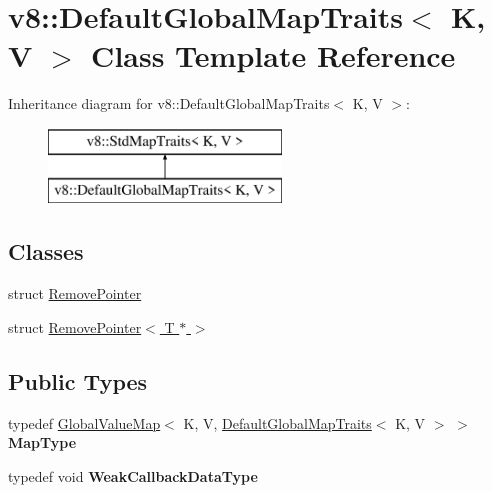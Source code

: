 \hypertarget{classv8_1_1_default_global_map_traits}{}\section{v8\+:\+:Default\+Global\+Map\+Traits$<$ K, V $>$ Class Template Reference}
\label{classv8_1_1_default_global_map_traits}
Inheritance diagram for v8\+:\+:Default\+Global\+Map\+Traits$<$ K, V $>$\+:\begin{figure}[H]
\begin{center}
\leavevmode
\includegraphics[height=2.000000cm]{classv8_1_1_default_global_map_traits}
\end{center}
\end{figure}
\subsection*{Classes}
\begin{DoxyCompactItemize}
\item 
struct \hyperlink{structv8_1_1_default_global_map_traits_1_1_remove_pointer}{Remove\+Pointer}
\item 
struct \hyperlink{structv8_1_1_default_global_map_traits_1_1_remove_pointer_3_01_t_01_5_01_4}{Remove\+Pointer$<$ T $\ast$ $>$}
\end{DoxyCompactItemize}
\subsection*{Public Types}
\begin{DoxyCompactItemize}
\item 
typedef \hyperlink{classv8_1_1_global_value_map}{Global\+Value\+Map}$<$ K, V, \hyperlink{classv8_1_1_default_global_map_traits}{Default\+Global\+Map\+Traits}$<$ K, V $>$ $>$ {\bfseries Map\+Type}\hypertarget{classv8_1_1_default_global_map_traits_a6626b089621a436fde5ac1a1132cc83c}{}\label{classv8_1_1_default_global_map_traits_a6626b089621a436fde5ac1a1132cc83c}

\item 
typedef void {\bfseries Weak\+Callback\+Data\+Type}\hypertarget{classv8_1_1_default_global_map_traits_af5285197aae83dcb00d0381fbc90869e}{}\label{classv8_1_1_default_global_map_traits_af5285197aae83dcb00d0381fbc90869e}

\end{DoxyCompactItemize}
